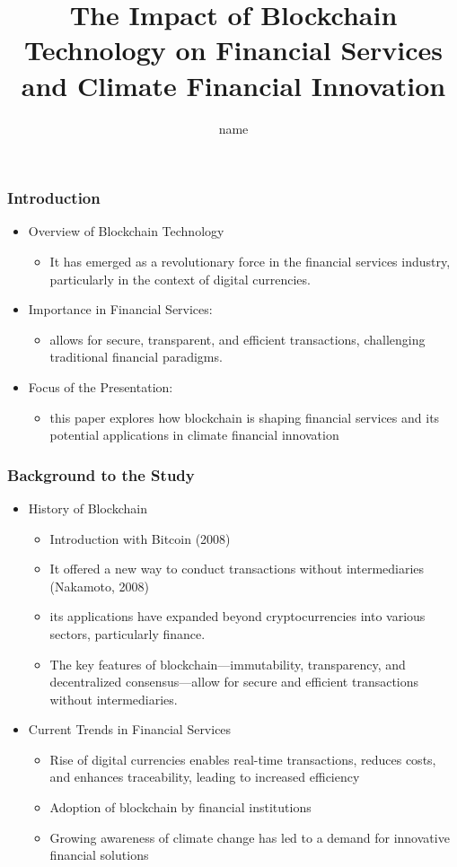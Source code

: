 \documentclass{beamer}
\title{The Impact of Blockchain Technology on Financial Services and Climate Financial Innovation}
\author{name}
\date{}
\begin{document}
\frame{\titlepage}

\begin{frame}
    \frametitle{Introduction}
    \begin{itemize}
        \item Overview of Blockchain Technology
        \begin{itemize}
            \item It has emerged as a revolutionary force in the financial services industry, particularly in the context of digital currencies. 
            \end{itemize}
        \item Importance in Financial Services:
        \begin{itemize}
            
            \item allows for secure, transparent, and efficient transactions, challenging traditional financial paradigms.
        \end{itemize}
        \item Focus of the Presentation:
        \begin{itemize}
            \item this paper explores how blockchain is shaping financial services and its potential applications in climate financial innovation
        \end{itemize}
    \end{itemize}
\end{frame}

\begin{frame}
    \frametitle{Background to the Study}
    \begin{itemize}
        \item History of Blockchain
        \begin{itemize}
            \item Introduction with Bitcoin (2008)
            \item It offered a new way to conduct transactions without intermediaries (Nakamoto, 2008)
            \item its applications have expanded beyond cryptocurrencies into various sectors, particularly finance. 
            \item The key features of blockchain—immutability, transparency, and decentralized consensus—allow for secure and efficient transactions without intermediaries.
        \end{itemize}
        \item Current Trends in Financial Services
        \begin{itemize}
            \item Rise of digital currencies enables real-time transactions, reduces costs, and enhances traceability, leading to increased efficiency
            \item Adoption of blockchain by financial institutions
            \item Growing awareness of climate change has led to a demand for innovative financial solutions
        \end{itemize}
    \end{itemize}
\end{frame}
\end{document}
